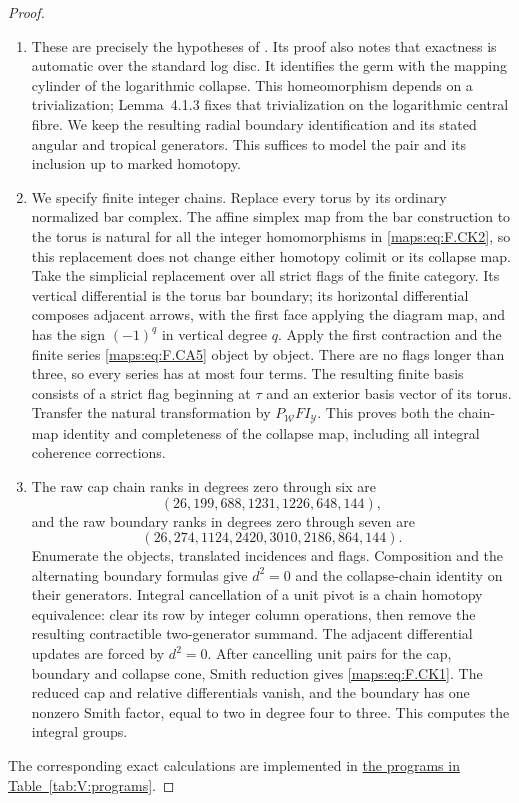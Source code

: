 \documentclass[11pt,a4paper]{article}
\numberwithin{equation}{section}
\theoremstyle{definition}
\begin{document}
\begin{proof}
\begin{enumerate}[label=\arabic*.]
\item These are precisely the hypotheses of
\cite[Theorem~4.1.1, pp.~480--482]{ffAchingerOgus20}.
Its proof also notes that exactness is automatic over the
standard log disc.  It identifies the germ with the mapping
cylinder of the logarithmic collapse.  This homeomorphism
depends on a trivialization; Lemma~4.1.3 fixes that
trivialization on the logarithmic central fibre.  We keep
the resulting radial boundary identification and its stated
angular and tropical generators.  This suffices to model
the pair and its inclusion up to marked homotopy.  

\item We specify finite integer chains.  Replace every
torus by its ordinary normalized bar complex.  The affine
simplex map from the bar construction to the torus is natural
for all the integer homomorphisms in \eqref{maps:eq:F.CK2}, so this replacement
does not change either homotopy colimit or its collapse map.
Take the simplicial replacement over all strict flags of the
finite category.  Its vertical differential is the torus bar
boundary; its horizontal differential composes adjacent
arrows, with the first face applying the diagram map, and
has the sign $(-1)^q$ in vertical degree $q$.
Apply the first contraction and the finite series \eqref{maps:eq:F.CA5}
object by object.  There are no flags longer than three,
so every series has at most four terms.  The resulting
finite basis consists of a strict flag beginning at $\tau$
and an exterior basis vector of its torus.  Transfer the
natural transformation by $P_{\mathcal W}FI_{\mathcal Y}$.
This proves both the chain-map identity and completeness of
the collapse map, including all integral coherence corrections.

\item The raw cap chain ranks in degrees zero through six are
\[
 (26,199,688,1231,1226,648,144),
\]
and the raw boundary ranks in degrees zero through seven are
\[
 (26,274,1124,2420,3010,2186,864,144).
\]
Enumerate the objects, translated incidences and flags. Composition
and the alternating boundary formulas give $d^2=0$ and the
collapse-chain identity on their generators.  Integral cancellation of a
unit pivot is a chain homotopy equivalence: clear its row by
integer column operations, then remove the resulting
contractible two-generator summand.  The adjacent differential
updates are forced by $d^2=0$.  After cancelling unit pairs for the cap, boundary and collapse cone, Smith reduction gives \eqref{maps:eq:F.CK1}. The reduced cap and
relative differentials vanish, and the boundary has one
nonzero Smith factor, equal to two in degree four to three.
This computes the integral groups.
\end{enumerate}
The corresponding exact calculations are implemented in \hyperlink{prog:V:chains}{the programs in Table~\ref*{tab:V:programs}}.
\end{proof}
\end{document}
